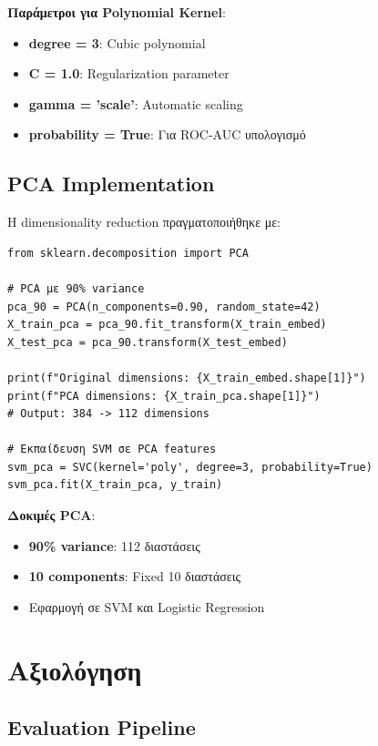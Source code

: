 \documentclass[12pt,a4paper,twoside]{book}
\begin{document}
\textbf{Παράμετροι για Polynomial Kernel}:
\begin{itemize}
    \item \textbf{degree = 3}: Cubic polynomial
    \item \textbf{C = 1.0}: Regularization parameter
    \item \textbf{gamma = 'scale'}: Automatic scaling
    \item \textbf{probability = True}: Για ROC-AUC υπολογισμό
\end{itemize}

\subsection{PCA Implementation}

Η dimensionality reduction πραγματοποιήθηκε με:

\begin{tcolorbox}[myCustomStyle={PCA Dimensionality Reduction}]
    \begin{lstlisting}[style=myPythonStyle]
from sklearn.decomposition import PCA

# PCA με 90% variance
pca_90 = PCA(n_components=0.90, random_state=42)
X_train_pca = pca_90.fit_transform(X_train_embed)
X_test_pca = pca_90.transform(X_test_embed)

print(f"Original dimensions: {X_train_embed.shape[1]}")
print(f"PCA dimensions: {X_train_pca.shape[1]}")
# Output: 384 -> 112 dimensions

# Εκπαίδευση SVM σε PCA features
svm_pca = SVC(kernel='poly', degree=3, probability=True)
svm_pca.fit(X_train_pca, y_train)
\end{lstlisting}
\end{tcolorbox}

\textbf{Δοκιμές PCA}:
\begin{itemize}
    \item \textbf{90\% variance}: 112 διαστάσεις
    \item \textbf{10 components}: Fixed 10 διαστάσεις
    \item Εφαρμογή σε SVM και Logistic Regression
\end{itemize}

\section{Αξιολόγηση}

\subsection{Evaluation Pipeline}
\end{document}
